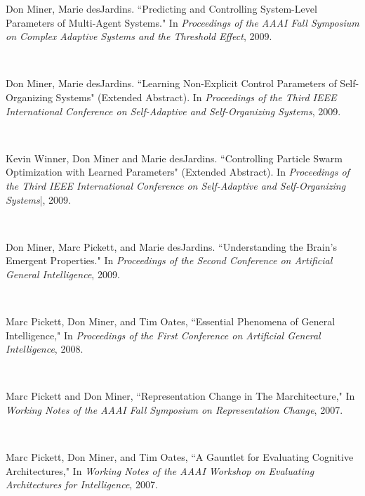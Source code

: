 \begin{titlepage}
\begin{flushleft}
\begin{singlespace}
  {\hspace{0.4in}} \parbox[t]{5.5in}{ Don Miner, Marie desJardins. ``Predicting and Controlling System-Level Parameters of Multi-Agent Systems." In {\em Proceedings of the AAAI Fall Symposium on Complex Adaptive Systems and the Threshold Effect}, 2009.}\\
  {\vspace{5pt}}
  {\hspace{0.4in}} \parbox[t]{5.5in}{ Don Miner, Marie desJardins. ``Learning Non-Explicit Control Parameters of Self-Organizing Systems" (Extended Abstract). In {\em Proceedings of  the Third IEEE International Conference on Self-Adaptive and Self-Organizing Systems}, 2009.}\\
  {\vspace{5pt}}
  {\hspace{0.4in}} \parbox[t]{5.5in}{ Kevin Winner, Don Miner and Marie desJardins. ``Controlling Particle Swarm Optimization with Learned Parameters" (Extended Abstract). In {\em Proceedings of the Third IEEE International Conference on Self-Adaptive and Self-Organizing Systems}|, 2009.}\\
  {\vspace{5pt}}
  {\hspace{0.4in}} \parbox[t]{5.5in}{ Don Miner, Marc Pickett, and Marie desJardins. ``Understanding the Brain's Emergent Properties." In {\em Proceedings of the Second Conference on Artificial General Intelligence}, 2009.}\\
  {\vspace{5pt}}
  {\hspace{0.4in}} \parbox[t]{5.5in}{ Marc Pickett, Don Miner, and Tim Oates, ``Essential Phenomena of General Intelligence," In {\em Proceedings of the First Conference on Artificial General Intelligence}, 2008.}\\
  {\vspace{5pt}}
  {\hspace{0.4in}} \parbox[t]{5.5in}{ Marc Pickett and Don Miner, ``Representation Change in The Marchitecture," In {\em Working Notes of the AAAI Fall Symposium on Representation Change}, 2007.}\\
  {\vspace{5pt}}
  {\hspace{0.4in}} \parbox[t]{5.5in}{ Marc Pickett, Don Miner, and Tim Oates, ``A Gauntlet for Evaluating Cognitive Architectures," In {\em Working Notes of the AAAI Workshop on Evaluating Architectures for Intelligence}, 2007. }\\

\end{singlespace}
\end{flushleft}
\end{titlepage}
